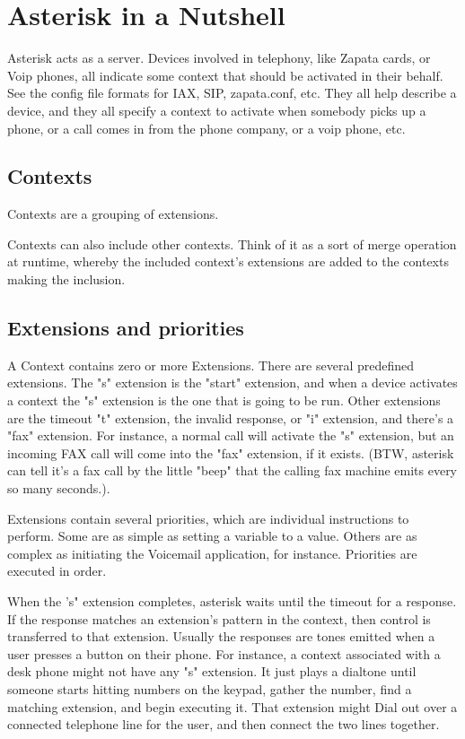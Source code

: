 \section{Asterisk in a Nutshell}

Asterisk acts as a server. Devices involved in telephony, like Zapata
cards, or Voip phones, all indicate some context that should be
activated in their behalf. See the config file formats for IAX, SIP,
zapata.conf, etc. They all help describe a device, and they all
specify a context to activate when somebody picks up a phone, or a
call comes in from the phone company, or a voip phone, etc.

\subsection{Contexts}

Contexts are a grouping of extensions.

Contexts can also include other contexts. Think of it as a sort of
merge operation at runtime, whereby the included context's extensions
are added to the contexts making the inclusion.

\subsection{Extensions and priorities}

A Context contains zero or more Extensions. There are several
predefined extensions. The "s" extension is the "start" extension, and
when a device activates a context the "s" extension is the one that is
going to be run. Other extensions are the timeout "t" extension, the
invalid response, or "i" extension, and there's a "fax" extension. For
instance, a normal call will activate the "s" extension, but an
incoming FAX call will come into the "fax" extension, if it
exists. (BTW, asterisk can tell it's a fax call by the little "beep"
that the calling fax machine emits every so many seconds.).

Extensions contain several priorities, which are individual
instructions to perform. Some are as simple as setting a variable to a
value. Others are as complex as initiating the Voicemail application,
for instance. Priorities are executed in order.

When the 's" extension completes, asterisk waits until the timeout for
a response. If the response matches an extension's pattern in the
context, then control is transferred to that extension. Usually the
responses are tones emitted when a user presses a button on their
phone. For instance, a context associated with a desk phone might not
have any "s" extension. It just plays a dialtone until someone starts
hitting numbers on the keypad, gather the number, find a matching
extension, and begin executing it. That extension might Dial out over
a connected telephone line for the user, and then connect the two
lines together.

